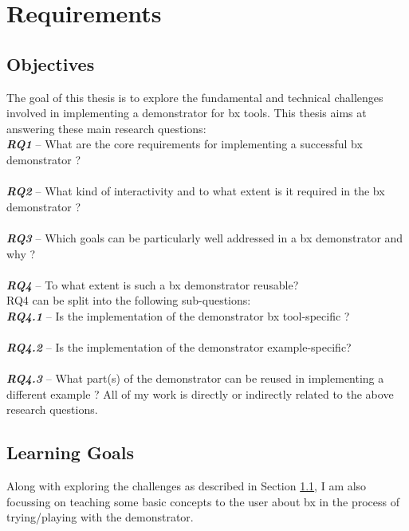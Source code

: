 \section{Requirements}\label{sec:requirements}
\subsection{Objectives}\label{subsec:objectives}
The goal of this thesis is to explore the fundamental and technical challenges involved in implementing a demonstrator for bx tools.
\newline\newline This thesis aims at answering these main research questions:
\\\textbf{\textit{RQ1}} -- What are the core requirements for implementing a successful bx demonstrator ?\\
\\\textbf{\textit{RQ2}} -- What kind of interactivity and to what extent is it required in the bx demonstrator ?\\
\\\textbf{\textit{RQ3}} -- Which goals can be particularly well addressed in a bx demonstrator and why ?\\
\\\textbf{\textit{RQ4}} -- To what extent is such a bx demonstrator reusable?\\
RQ4 can be split into the following sub-questions:
\\\textbf{\textit{RQ4.1}} -- Is the implementation of the demonstrator bx tool-specific ?\\
\\\textbf{\textit{RQ4.2}} -- Is the implementation of the demonstrator example-specific?\\
\\\textbf{\textit{RQ4.3}} -- What part(s) of the demonstrator can be reused in implementing a different example ?
\newline\newline All of my work is directly or indirectly related to the above research questions.

\subsection{Learning Goals}\label{subsec:learninggoals}
Along with exploring the challenges as described in Section \ref{subsec:objectives}, I am also focussing on teaching some basic concepts to the user about bx in the process of trying/playing with the demonstrator.

